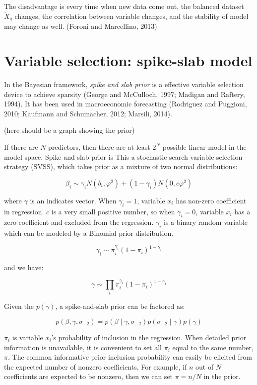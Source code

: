 The disadvantage is every time when new data come out, the balanced dataset $\tilde X_q$ changes, the correlation between variable changes, and the stability of model may change as well. (Foroni and Marcellino, 2013)



\section{Variable selection: spike-slab model}

In the Bayesian framework, \textit{spike and slab prior} is a effective variable selection device to achieve sparsity (George and McCulloch, 1997; Madigan and Raftery, 1994). It has been used in macroeconomic forecasting (Rodriguez and Puggioni, 2010; Kaufmann and Schumacher, 2012; Marsili, 2014).


(here should be a graph showing the prior)

If there are $N$ predictors, then there are at least $2^N$ possible linear model in the model space. Spike and slab prior is This a stochastic search variable selection strategy (SVSS), which takes prior as a mixture of two normal distributions:

$$\beta_i \sim \gamma_i N(b_i,\varphi^2)   + (1-\gamma_i) N(0, c \varphi^2)$$

where $\gamma$ is an indicates vector. When $\gamma_i = 1$, variable $x_i$ has non-zero coefficient in regression. $c$ is a very small positive number, so when $\gamma_i = 0$, variable $x_i$ has a zero coefficient and excluded from the regression. $\gamma_i$ is a binary random variable which can be modeled by a Binomial prior distribution.

$$\gamma_i \sim \pi_{i}^{\gamma_i}(1- \pi_{i})^{1-\gamma_i}$$

and we have:



$$\gamma \sim \prod_{i} \pi_{i}^{\gamma_i}(1- \pi_{i})^{1-\gamma_i}$$


 
Given the $p(\gamma)$, a spike-and-slab prior can be factored as:  


$$ p(\beta,\gamma, \sigma_{-2}) = p(\beta \mid \gamma, \sigma_{-2})p(\sigma_{-2} \mid \gamma )p(\gamma)$$


$\pi_i$ is variable $x_i$'s probability of inclusion in the regression. When detailed prior information is unavailable, it is convenient to set all $\pi_i$ equal to the same number, $\pi$. The common informative prior inclusion probability can easily be elicited from the expected number of nonzero coefficients. For example, if $n$ out of $N$ coefficients are expected to be nonzero, then we can set $\pi = n/N$ in the prior.

